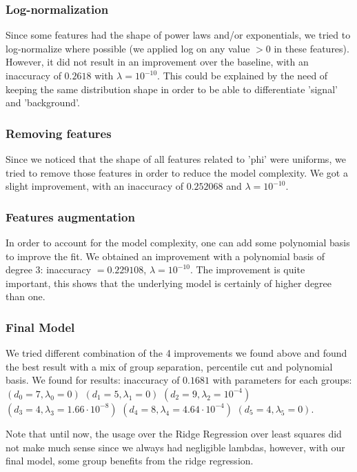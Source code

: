 \documentclass[10pt,conference,compsocconf]{IEEEtran}
\begin{document}
\subsubsection{Log-normalization}
Since some features had the shape of power laws and/or exponentials, we tried to
log-normalize where possible (we applied log on any value $>0$ in these
features). However, it did not result in an improvement over the baseline, with
an inaccuracy of $0.2618$ with $\lambda = 10^{-10}$. This could be explained by
the need of keeping the same distribution shape in order to be able to
differentiate 'signal' and 'background'.

\subsubsection{Removing features}
Since we noticed that the shape of all features related to 'phi' were uniforms,
we tried to remove those features in order to reduce the model complexity. We
got a slight improvement, with an inaccuracy of $0.252068$ and $\lambda =
10^{-10}$.

\subsubsection{Features augmentation}
In order to account for the model complexity, one can add some polynomial basis
to improve the fit. We obtained an improvement with a polynomial basis of degree
3: inaccuracy $= 0.229108$, $\lambda = 10^{-10}$. The improvement is quite
important, this shows that the underlying model is certainly of higher degree
than one.

\subsubsection{Final Model}
We tried different combination of the 4 improvements we found above and found
the best result with a mix of group separation, percentile cut and polynomial
basis. We found for results: inaccuracy of $0.1681$ with parameters for each groups:
$(d_0 = 7, \lambda_0 = 0)$
$(d_1 = 5, \lambda_1 = 0)$
$(d_2 = 9, \lambda_2 = 10^{-4})$
$(d_3 = 4, \lambda_3 = 1.66 \cdot 10^{-8})$
$(d_4 = 8, \lambda_4 = 4.64 \cdot 10^{-4})$
$(d_5 = 4, \lambda_5 = 0)$.

Note that until now, the usage over the Ridge Regression over least squares did
not make much sense since we always had negligible lambdas, however, with our
final model, some group benefits from the ridge regression.
\end{document}
